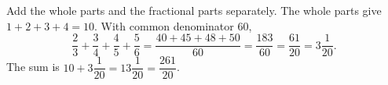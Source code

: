 Add the whole parts and the fractional parts separately. The whole parts give $1+2+3+4=10$. With common denominator $60$,
\[
\dfrac{2}{3}+\dfrac{3}{4}+\dfrac{4}{5}+\dfrac{5}{6}=\dfrac{40+45+48+50}{60}=\dfrac{183}{60}=\dfrac{61}{20}=3\dfrac{1}{20}.
\]
The sum is $10+3\dfrac{1}{20}=\boxed{13\dfrac{1}{20}}=\dfrac{261}{20}$.
